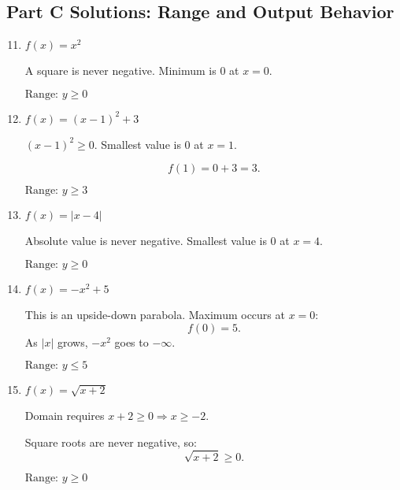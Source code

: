 \documentclass[12pt]{article}
\begin{document}
\subsection*{Part C Solutions: Range and Output Behavior}
\begin{enumerate}
  \setcounter{enumi}{10}
  \item \(f(x) = x^2\)

  A square is never negative. Minimum is 0 at \(x = 0.\)

  \(\boxed{\text{Range: } y \ge 0}\)

  \item \(f(x) = (x - 1)^2 + 3\)

  \((x - 1)^2 \ge 0\). Smallest value is 0 at \(x = 1.\)

  \[
  f(1) = 0 + 3 = 3.
  \]

  \(\boxed{\text{Range: } y \ge 3}\)

  \item \(f(x) = |x - 4|\)

  Absolute value is never negative. Smallest value is 0 at \(x = 4.\)

  \(\boxed{\text{Range: } y \ge 0}\)

  \item \(f(x) = -x^2 + 5\)

  This is an upside-down parabola. Maximum occurs at \(x = 0\):
  \[
  f(0) = 5.
  \]
  As \(|x|\) grows, \(-x^2\) goes to \(-\infty.\)

  \(\boxed{\text{Range: } y \le 5}\)

  \item \(f(x) = \sqrt{x + 2}\)

  Domain requires \(x + 2 \ge 0 \Rightarrow x \ge -2.\)

  Square roots are never negative, so:
  \[
  \sqrt{x + 2} \ge 0.
  \]

  \(\boxed{\text{Range: } y \ge 0}\)
\end{enumerate}
\end{document}
